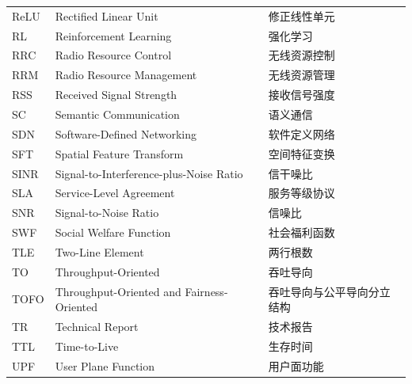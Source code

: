 \begin{abbreviation}
\begin{longtable}{@{} p{} p{} p{} @{}}
  ReLU      & Rectified Linear Unit                                          & 修正线性单元                  \\
  RL        & Reinforcement Learning                                         & 强化学习                      \\
  RRC       & Radio Resource Control                                         & 无线资源控制                  \\
  RRM       & Radio Resource Management                                      & 无线资源管理                  \\
  RSS       & Received Signal Strength                                       & 接收信号强度                  \\
  SC        & Semantic Communication                                        & 语义通信                      \\
  SDN       & Software-Defined Networking                                    & 软件定义网络                  \\
  SFT       & Spatial Feature Transform                                      & 空间特征变换                  \\
  SINR      & Signal-to-Interference-plus-Noise Ratio                         & 信干噪比                      \\
  SLA       & Service-Level Agreement                                        & 服务等级协议                  \\
  SNR       & Signal-to-Noise Ratio                                          & 信噪比                        \\
  SWF       & Social Welfare Function                                        & 社会福利函数                  \\
  TLE       & Two-Line Element                                                & 两行根数                      \\
  TO        & Throughput-Oriented                                             & 吞吐导向                      \\
  TOFO      & Throughput-Oriented and Fairness-Oriented                       & 吞吐导向与公平导向分立结构    \\
  TR        & Technical Report                                                & 技术报告                      \\
  TTL       & Time-to-Live                                                    & 生存时间                      \\
  UPF       & User Plane Function                                             & 用户面功能                    \\

\end{longtable}
\end{abbreviation}
